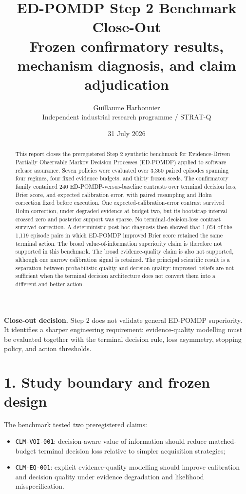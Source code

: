 \documentclass[11pt,a4paper]{article}
\title{\textbf{ED-POMDP Step 2 Benchmark Close-Out}\\
\large Frozen confirmatory results, mechanism diagnosis, and claim adjudication}
\author{Guillaume Harbonnier\\Independent industrial research programme / STRAT-Q}
\date{31 July 2026}
\newcommand{\voi}{\texttt{CLM-VOI-001}}
\newcommand{\eqclaim}{\texttt{CLM-EQ-001}}
\begin{document}
\maketitle

\begin{abstract}
This report closes the preregistered Step 2 synthetic benchmark for Evidence-Driven Partially Observable Markov Decision Processes (ED-POMDP) applied to software release assurance. Seven policies were evaluated over 3,360 paired episodes spanning four regimes, four fixed evidence budgets, and thirty frozen seeds. The confirmatory family contained 240 ED-POMDP-versus-baseline contrasts over terminal decision loss, Brier score, and expected calibration error, with paired resampling and Holm correction fixed before execution. One expected-calibration-error contrast survived Holm correction, under degraded evidence at budget two, but its bootstrap interval crossed zero and posterior support was sparse. No terminal-decision-loss contrast survived correction. A deterministic post-hoc diagnosis then showed that 1,054 of the 1,119 episode pairs in which ED-POMDP improved Brier score retained the same terminal action. The broad value-of-information superiority claim is therefore not supported in this benchmark. The broad evidence-quality claim is also not supported, although one narrow calibration signal is retained. The principal scientific result is a separation between probabilistic quality and decision quality: improved beliefs are not sufficient when the terminal decision architecture does not convert them into a different and better action.
\end{abstract}

\begin{tcolorbox}[colback=softblue,colframe=deepblue,boxrule=0.7pt,arc=2mm]
\textbf{Close-out decision.} Step 2 does not validate general ED-POMDP superiority. It identifies a sharper engineering requirement: evidence-quality modelling must be evaluated together with the terminal decision rule, loss asymmetry, stopping policy, and action thresholds.
\end{tcolorbox}

\section*{1. Study boundary and frozen design}

The benchmark tested two preregistered claims:

\begin{itemize}
  \item \voi: decision-aware value of information should reduce matched-budget terminal decision loss relative to simpler acquisition strategies;
  \item \eqclaim: explicit evidence-quality modelling should improve calibration and decision quality under evidence degradation and likelihood misspecification.
\end{itemize}
\end{document}
